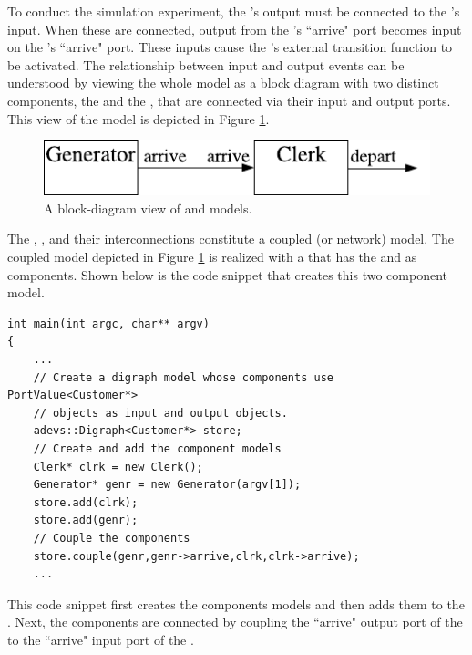 To conduct the simulation experiment, the 's output must be connected to the 's input.  When these are connected, output from the 's ``arrive" port becomes input on the 's ``arrive" port. These inputs cause the 's external transition function to be activated. The relationship between input and output events can be understood by viewing the whole model as a block diagram with two distinct components, the  and the , that are connected via their input and output ports. This view of the model is depicted in Figure \ref{fig:clerk_and_generator}.
\begin{figure}[ht]
\centering
\includegraphics{intro_figs/generator_and_clerk.pdf}
\caption{A block-diagram view of  and  models.}
\label{fig:clerk_and_generator}
\end{figure}

The , , and their interconnections constitute a coupled (or network) model. The coupled model depicted in Figure \ref{fig:clerk_and_generator} is realized with a  that has the  and  as components. Shown below is the code snippet that creates this two component model.
\begin{verbatim}
int main(int argc, char** argv)
{
    ...
    // Create a digraph model whose components use PortValue<Customer*>
    // objects as input and output objects.
    adevs::Digraph<Customer*> store;
    // Create and add the component models
    Clerk* clrk = new Clerk();
    Generator* genr = new Generator(argv[1]);
    store.add(clrk);
    store.add(genr);
    // Couple the components
    store.couple(genr,genr->arrive,clrk,clrk->arrive);
    ...
\end{verbatim}
This code snippet first creates the components models and then adds them to the . Next, the components are connected by coupling the ``arrive" output port of the  to the ``arrive" input port of the .

